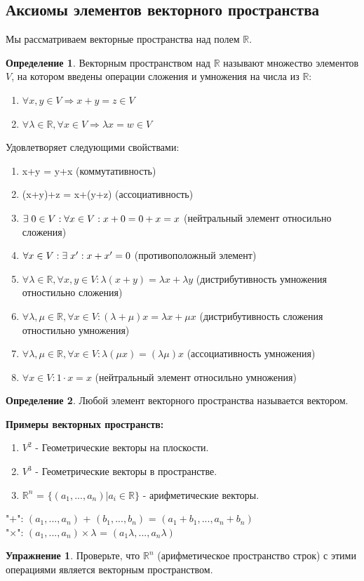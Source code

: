 \documentclass[a4paper, 12pt]{article}
\newcommand{\R}{\mathbb R}
\newcommand\tab[1][.5cm]{\hspace*{#1}}
\theoremstyle{definition}
\newtheorem*{definition}{Определение}
\newtheorem*{lalala}{Упражнение}
\begin{document}
  \subsection{Аксиомы элементов векторного пространства}
  Мы рассматриваем векторные пространства над полем $\R$.
  \begin{definition}
    Векторным пространством над $\R$ называют множество элементов $V$, на котором введены операции сложения и умножения на числа из $\R$:
    \begin{enumerate}
      \item $ \forall x,y \in V \Longrightarrow x+y=z \in V$
      \item $\forall \lambda \in \R, \forall x \in V \Longrightarrow \lambda x = w \in V$ 
    \end{enumerate}
    Удовлетворяет следующими свойствами:
    \begin{enumerate}
      \item x+y = y+x (коммутативность)
      \item (x+y)+z = x+(y+z) (ассоциативность)
      \item $\exists \tab[0.1cm] 0 \in V: \forall x \in V: x+0 = 0+x = x$ (нейтральный элемент относильно сложения)
      \item $\forall x \in V: \exists \tab[0.1cm] x^{\prime}: x + x^{\prime} = 0$ (противоположный элемент)
      \item $\forall \lambda \in \R, \forall x,y \in V: \lambda (x+y) = \lambda x + \lambda y$ (дистрибутивность умножения отностильно сложения)
      \item $\forall \lambda, \mu \in \R, \forall x \in V: (\lambda+\mu)x = \lambda x + \mu x $ (дистрибутивность сложения отностильно умножения)
      \item $\forall \lambda, \mu \in \R, \forall x \in V: \lambda(\mu x) = (\lambda \mu) x $ (ассоциативность умножения)
      \item $\forall x \in V: 1 \cdot x = x$ (нейтральный элемент относильно умножения)
    \end{enumerate}
  \end{definition} 

  \begin{definition}
    Любой элемент векторного пространства называется вектором.
  \end{definition} 

  \textbf{Примеры векторных пространств:} 
    \begin{enumerate} 
      \item $V^2$ - Геометрические векторы на плоскости.
      \item $V^3$ - Геометрические векторы в пространстве.
      \item $\R^n$ = $\{ {(a_1,...,a_n) | a_i \in \R} \}$ - арифметические векторы.
    \end{enumerate}
    \tab[0.8cm]"$+$": $(a_1,...,a_n)$ + $(b_1,...,b_n)$ = $(a_1+b_1,...,a_n+b_n)$ \\
    \tab[0.8cm]"$\times$": $(a_1,...,a_n) \times \lambda$ = $(a_1\lambda,...,a_n\lambda)$ 
  \begin{lalala}
    Проверьте, что $\R^n$ (арифметическое пространство строк) с этими операциями является векторным пространством. 
  \end{lalala}  
\end{document}
